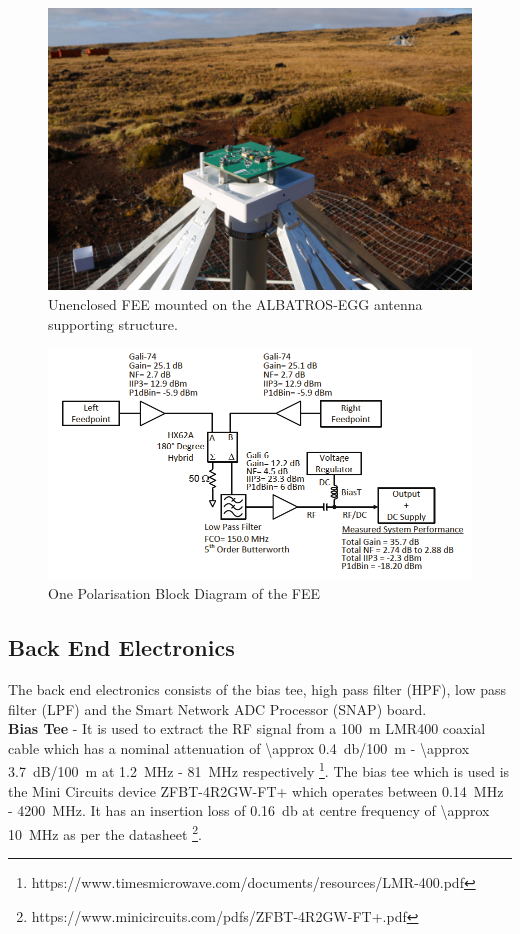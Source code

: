 \documentclass{ws-jai}
\begin{document}
\begin{figure}[h]
	\begin{center}
		\includegraphics[width=0.5\linewidth]{Figures/balun.jpg}
		\caption{Unenclosed FEE mounted on the ALBATROS-EGG antenna supporting structure.} 
		\label{Fig:Balun}
	\end{center}
\end{figure}

\begin{figure}[h]
	\begin{center}
		\includegraphics[width=0.7\linewidth]{Figures/Balun_Block.png}
		\caption{One Polarisation Block Diagram of the FEE \cite{2012PASP..124.1090H}}
		\label{Fig:Balun Schematic}
	\end{center}
\end{figure}

\subsection{Back End Electronics}	
The back end electronics consists of the bias tee, high pass filter (HPF), low pass filter (LPF) and the Smart Network ADC Processor (SNAP) board. \\

\textbf{Bias Tee} - It is used to extract the RF signal from a \SI{100}{\metre} LMR400 coaxial cable which has a nominal attenuation of \SI{\approx 0.4}{\decibel/\SI{100}{m}} - \SI{\approx 3.7}{dB/\SI{100}{\metre}} at \SI{1.2}{MHz} - \SI{81}{MHz} respectively \footnote{https://www.timesmicrowave.com/documents/resources/LMR-400.pdf}. The bias tee which is used is the Mini Circuits device ZFBT-4R2GW-FT+ which operates between \SI{0.14}{MHz} - \SI{4200}{MHz}. It has an insertion loss of \SI{0.16}{\decibel} at centre frequency of  \SI{\approx 10}{MHz} as per the datasheet \footnote{https://www.minicircuits.com/pdfs/ZFBT-4R2GW-FT+.pdf}.\\
\end{document}
